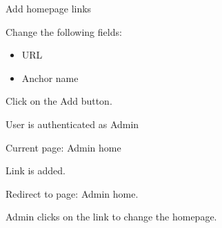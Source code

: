 
\begin{uc}{Add homepage links}

    \begin{uc-mss}
    \item Change the following fields:
        \begin{itemize}
            \item URL
            \item Anchor name
        \end{itemize}
    \item Click on the Add button.
    \end{uc-mss}

    \begin{uc-pre}
    \item User is authenticated as Admin
    \item Current page: Admin home
    \end{uc-pre}

    \begin{uc-post}
    \item Link is added.
    \item Redirect to page: Admin home.
    \end{uc-post}

    \begin{uc-trig}
        Admin clicks on the link to change the homepage.
    \end{uc-trig}

\end{uc}
